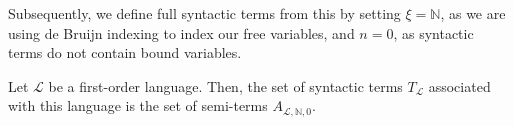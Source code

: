Subsequently, we define full syntactic terms from this by setting $\xi = \mathbb{N}$, as we are using de Bruijn indexing to index our free variables, and $n = 0$, as syntactic terms do not contain bound variables.

\begin{definition}\label{def:syntactic-term}
    \leanok
    Let $\mathcal{L}$ be a first-order language. Then, the set of syntactic terms $T_{\mathcal{L}}$ associated with this language is the set of semi-terms $A_{\mathcal{L},\mathbb{N},0}$. 
\end{definition}



